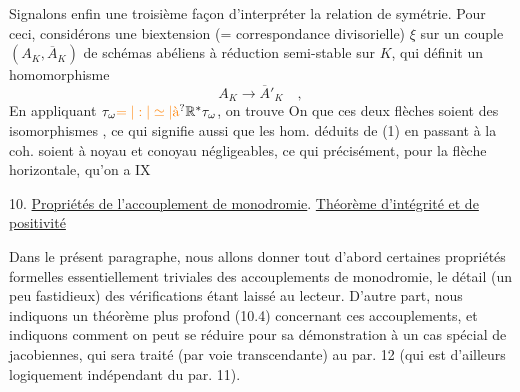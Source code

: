 Signalons enfin une troisième façon d'interpréter la relation de symétrie. Pour ceci, considérons une biextension (= correspondance divisorielle) $\xi$ sur un couple $(A_K,\overline A_K)$ de schémas abéliens à réduction semi-stable sur $K$, qui définit un homomorphisme
\[
 A_K\longrightarrow\overline A'_K\quad,
\]
En appliquant $\tau_\omega\unsure{=|:|\simeq|\text{à}}\mathbb R^*\tau_\omega$, on trouve
On   que ces deux flèches soient des isomorphismes , ce qui signifie aussi que les hom. déduits de (1) en passant à la coh.
soient à noyau et conoyau négligeables, ce qui   précisément, pour la flèche horizontale, qu'on a
\hfill IX

10. \uline{Propriétés de l'accouplement de monodromie}. \uline{Théorème d'intégrité et de positivité}

Dans le présent paragraphe, nous allons donner tout d'abord certaines propriétés formelles essentiellement triviales des accouplements de monodromie, le détail (un peu fastidieux) des vérifications étant laissé au lecteur. D'autre part, nous indiquons un théorème plus profond (10.4) concernant ces accouplements, et indiquons comment on peut se réduire pour sa démonstration à un cas spécial de jacobiennes, qui sera traité (par voie transcendante) au par. 12 (qui est d'ailleurs logiquement indépendant du par. 11).

